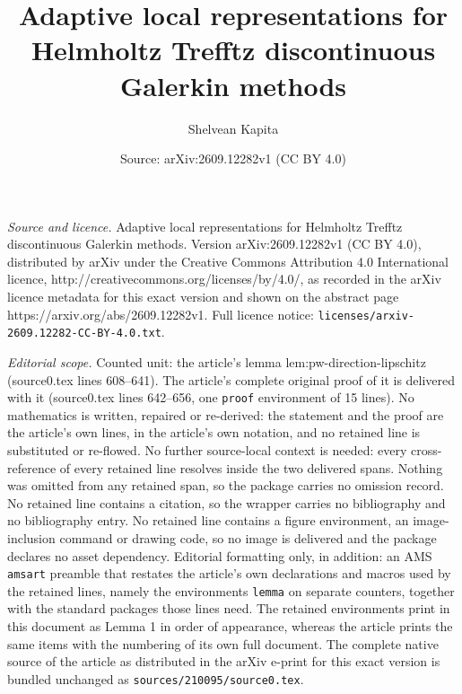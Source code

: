 \documentclass[10pt,a4paper]{amsart}
\title{Adaptive local representations for Helmholtz Trefftz discontinuous Galerkin methods}
\author{Shelvean Kapita}
\date{Source: arXiv:2609.12282v1 (CC BY 4.0)}
\begin{document}
\maketitle

\noindent\emph{Source and licence.} Adaptive local representations for Helmholtz Trefftz discontinuous Galerkin methods. Version arXiv:2609.12282v1 (CC BY 4.0), distributed by arXiv under the Creative Commons Attribution 4.0 International licence, http://creativecommons.org/licenses/by/4.0/, as recorded in the arXiv licence metadata for this exact version and shown on the abstract page https://arxiv.org/abs/2609.12282v1. Full licence notice: \texttt{licenses/arxiv-2609.12282-CC-BY-4.0.txt}.\par\smallskip

\noindent\textit{Editorial scope.} Counted unit: the article's lemma lem:pw-direction-lipschitz (source0.tex lines 608--641). The article's complete original proof of it is delivered with it (source0.tex lines 642--656, one \texttt{proof} environment of 15 lines). No mathematics is written, repaired or re-derived: the statement and the proof are the article's own lines, in the article's own notation, and no retained line is substituted or re-flowed.  No further source-local context is needed: every cross-reference of every retained line resolves inside the two delivered spans.  Nothing was omitted from any retained span, so the package carries no omission record.  No retained line contains a citation, so the wrapper carries no bibliography and no bibliography entry.  No retained line contains a figure environment, an image-inclusion command or drawing code, so no image is delivered and the package declares no asset dependency.  Editorial formatting only, in addition: an AMS \texttt{amsart} preamble that restates the article's own declarations and macros used by the retained lines, namely the environments \texttt{lemma} on separate counters, together with the standard packages those lines need.  The retained environments print in this document as Lemma 1 in order of appearance, whereas the article prints the same items with the numbering of its own full document.  The complete native source of the article as distributed in the arXiv e-print for this exact version is bundled unchanged as \texttt{sources/210095/source0.tex}.
\end{document}
